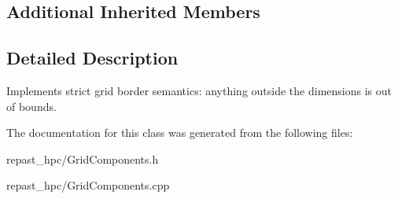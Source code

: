 \subsection*{Additional Inherited Members}


\subsection{Detailed Description}
Implements strict grid border semantics\-: anything outside the dimensions is out of bounds. 

The documentation for this class was generated from the following files\-:\begin{DoxyCompactItemize}
\item 
repast\-\_\-hpc/Grid\-Components.\-h\item 
repast\-\_\-hpc/Grid\-Components.\-cpp\end{DoxyCompactItemize}
